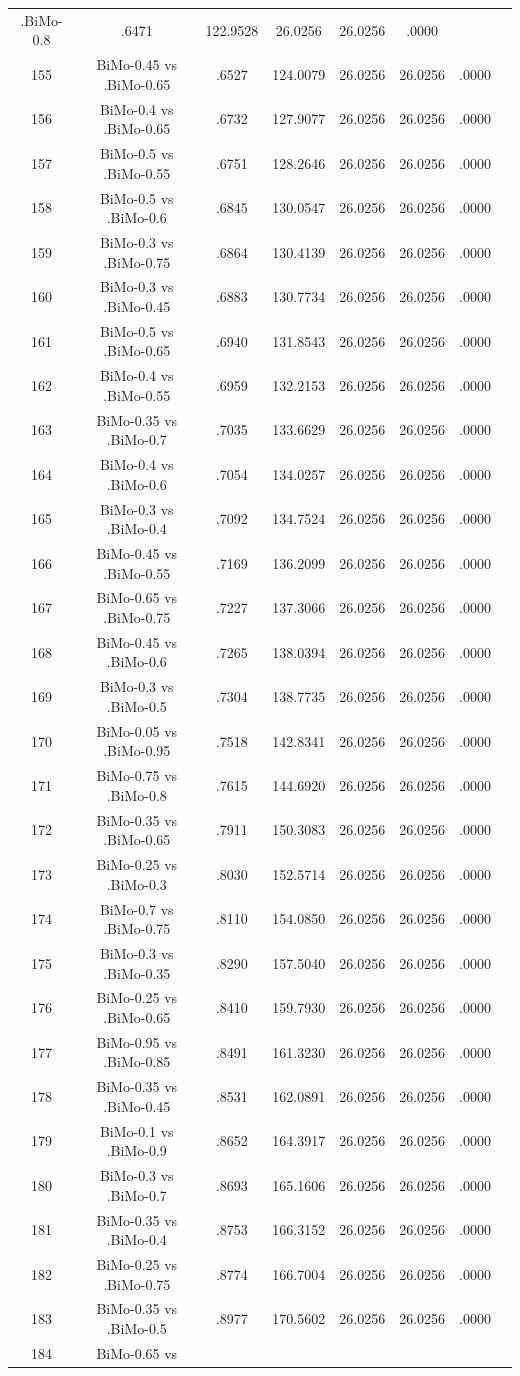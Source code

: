 \documentclass[a4paper,10pt]{article}
\begin{document}
\begin{landscape}
\begin{table}[!htp]
\begin{tabular}{cccccccc}
.BiMo-0.8&.6471&122.9528&26.0256&26.0256&.0000\\155&BiMo-0.45 vs .BiMo-0.65&.6527&124.0079&26.0256&26.0256&.0000\\156&BiMo-0.4 vs .BiMo-0.65&.6732&127.9077&26.0256&26.0256&.0000\\157&BiMo-0.5 vs .BiMo-0.55&.6751&128.2646&26.0256&26.0256&.0000\\158&BiMo-0.5 vs .BiMo-0.6&.6845&130.0547&26.0256&26.0256&.0000\\159&BiMo-0.3 vs .BiMo-0.75&.6864&130.4139&26.0256&26.0256&.0000\\160&BiMo-0.3 vs .BiMo-0.45&.6883&130.7734&26.0256&26.0256&.0000\\161&BiMo-0.5 vs .BiMo-0.65&.6940&131.8543&26.0256&26.0256&.0000\\162&BiMo-0.4 vs .BiMo-0.55&.6959&132.2153&26.0256&26.0256&.0000\\163&BiMo-0.35 vs .BiMo-0.7&.7035&133.6629&26.0256&26.0256&.0000\\164&BiMo-0.4 vs .BiMo-0.6&.7054&134.0257&26.0256&26.0256&.0000\\165&BiMo-0.3 vs .BiMo-0.4&.7092&134.7524&26.0256&26.0256&.0000\\166&BiMo-0.45 vs .BiMo-0.55&.7169&136.2099&26.0256&26.0256&.0000\\167&BiMo-0.65 vs .BiMo-0.75&.7227&137.3066&26.0256&26.0256&.0000\\168&BiMo-0.45 vs .BiMo-0.6&.7265&138.0394&26.0256&26.0256&.0000\\169&BiMo-0.3 vs .BiMo-0.5&.7304&138.7735&26.0256&26.0256&.0000\\170&BiMo-0.05 vs .BiMo-0.95&.7518&142.8341&26.0256&26.0256&.0000\\171&BiMo-0.75 vs .BiMo-0.8&.7615&144.6920&26.0256&26.0256&.0000\\172&BiMo-0.35 vs .BiMo-0.65&.7911&150.3083&26.0256&26.0256&.0000\\173&BiMo-0.25 vs .BiMo-0.3&.8030&152.5714&26.0256&26.0256&.0000\\174&BiMo-0.7 vs .BiMo-0.75&.8110&154.0850&26.0256&26.0256&.0000\\175&BiMo-0.3 vs .BiMo-0.35&.8290&157.5040&26.0256&26.0256&.0000\\176&BiMo-0.25 vs .BiMo-0.65&.8410&159.7930&26.0256&26.0256&.0000\\177&BiMo-0.95 vs .BiMo-0.85&.8491&161.3230&26.0256&26.0256&.0000\\178&BiMo-0.35 vs .BiMo-0.45&.8531&162.0891&26.0256&26.0256&.0000\\179&BiMo-0.1 vs .BiMo-0.9&.8652&164.3917&26.0256&26.0256&.0000\\180&BiMo-0.3 vs .BiMo-0.7&.8693&165.1606&26.0256&26.0256&.0000\\181&BiMo-0.35 vs .BiMo-0.4&.8753&166.3152&26.0256&26.0256&.0000\\182&BiMo-0.25 vs .BiMo-0.75&.8774&166.7004&26.0256&26.0256&.0000\\183&BiMo-0.35 vs .BiMo-0.5&.8977&170.5602&26.0256&26.0256&.0000\\184&BiMo-0.65 vs 
\end{tabular}
\end{table}
\end{landscape}
\end{document}
